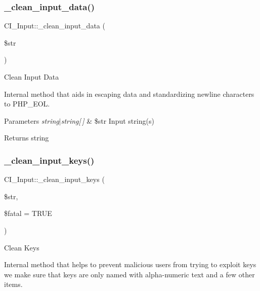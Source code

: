 \subsubsection{\texorpdfstring{\+\_\+clean\+\_\+input\+\_\+data()}{\_clean\_input\_data()}}
{\footnotesize\ttfamily C\+I\+\_\+\+Input\+::\+\_\+clean\+\_\+input\+\_\+data (\begin{DoxyParamCaption}\item[{}]{\$str }\end{DoxyParamCaption})\hspace{0.3cm}{\ttfamily [protected]}}

Clean Input Data

Internal method that aids in escaping data and standardizing newline characters to P\+H\+P\+\_\+\+E\+OL.


\begin{DoxyParams}{Parameters}
{\em string$\vert$string\mbox{[}$\,$\mbox{]}} & \$str Input string(s) \\
\hline
\end{DoxyParams}
\begin{DoxyReturn}{Returns}
string 
\end{DoxyReturn}
\mbox{\label{class_c_i___input_a845149c18f59609a4b338ec6700c3b0d}} 
\subsubsection{\texorpdfstring{\+\_\+clean\+\_\+input\+\_\+keys()}{\_clean\_input\_keys()}}
{\footnotesize\ttfamily C\+I\+\_\+\+Input\+::\+\_\+clean\+\_\+input\+\_\+keys (\begin{DoxyParamCaption}\item[{}]{\$str,  }\item[{}]{\$fatal = {\ttfamily TRUE} }\end{DoxyParamCaption})\hspace{0.3cm}{\ttfamily [protected]}}

Clean Keys

Internal method that helps to prevent malicious users from trying to exploit keys we make sure that keys are only named with alpha-\/numeric text and a few other items.


